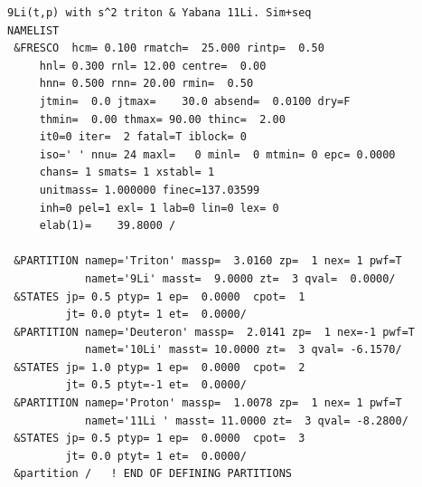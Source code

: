 \documentclass[11pt]{book}
\begin{document}
\begin{small} 
\begin{lstlisting}[frame=single]
9Li(t,p) with s^2 triton & Yabana 11Li. Sim+seq                                
NAMELIST
 &FRESCO  hcm= 0.100 rmatch=  25.000 rintp=  0.50
     hnl= 0.300 rnl= 12.00 centre=  0.00
     hnn= 0.500 rnn= 20.00 rmin=  0.50
     jtmin=  0.0 jtmax=    30.0 absend=  0.0100 dry=F 
     thmin=  0.00 thmax= 90.00 thinc=  2.00 
     it0=0 iter=  2 fatal=T iblock= 0 
     iso=' ' nnu= 24 maxl=   0 minl=  0 mtmin= 0 epc= 0.0000
     chans= 1 smats= 1 xstabl= 1 
     unitmass= 1.000000 finec=137.03599
     inh=0 pel=1 exl= 1 lab=0 lin=0 lex= 0
     elab(1)=    39.8000 /

 &PARTITION namep='Triton' massp=  3.0160 zp=  1 nex= 1 pwf=T                 
            namet='9Li' masst=  9.0000 zt=  3 qval=  0.0000/               
 &STATES jp= 0.5 ptyp= 1 ep=  0.0000  cpot=  1                                  
         jt= 0.0 ptyt= 1 et=  0.0000/                                           
 &PARTITION namep='Deuteron' massp=  2.0141 zp=  1 nex=-1 pwf=T                 
            namet='10Li' masst= 10.0000 zt=  3 qval= -6.1570/               
 &STATES jp= 1.0 ptyp= 1 ep=  0.0000  cpot=  2                                  
         jt= 0.5 ptyt=-1 et=  0.0000/                                           
 &PARTITION namep='Proton' massp=  1.0078 zp=  1 nex= 1 pwf=T                 
            namet='11Li ' masst= 11.0000 zt=  3 qval= -8.2800/               
 &STATES jp= 0.5 ptyp= 1 ep=  0.0000  cpot=  3                                  
         jt= 0.0 ptyt= 1 et=  0.0000/                                           
 &partition /   ! END OF DEFINING PARTITIONS                                    
\end{lstlisting}
\end{small}
\end{document}

